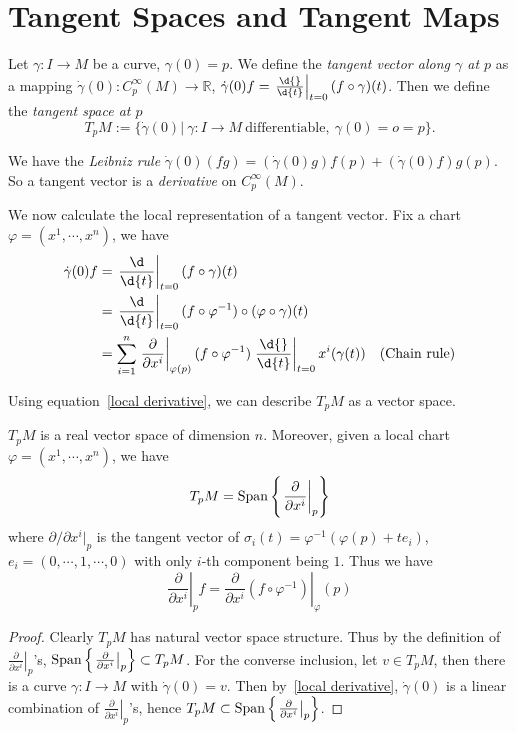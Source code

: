 \section{Tangent Spaces and Tangent Maps}

\begin{defn}
    Let $\gamma:I\to M$ be a curve, $\gamma(0)=p$.
    We define the \emph{tangent vector along $\gamma$ at $p$} as a mapping $\dot{\gamma}(0):C^\infty_p(M)\to\mathbb{R}$, $\dot{\gamma}(0)f=\left.\frac{\d{}}{\d{t}}\right|_{t=0}(f\circ\gamma)(t)$.
    Then we define the \emph{tangent space at $p$}
    \[T_pM:=\{\dot{\gamma}(0)|\ \gamma:I\to M\ \text{differentiable},\ \gamma(0)=o=p\}.\]
\end{defn}

\begin{prop}
    We have the \emph{Leibniz rule} $\dot{\gamma}(0)(fg)=(\dot{\gamma}(0)g)f(p)+(\dot{\gamma}(0)f)g(p)$.
    So a tangent vector is a \emph{derivative} on $C^\infty_p(M)$.
\end{prop}

We now calculate the local representation of a tangent vector.
Fix a chart $\varphi=(x^1,\cdots,x^n)$, we have
\begin{equation}
    \begin{aligned}
        \dot{\gamma}(0)f&=\left.\frac{\d}{\d{t}}\right|_{t=0}(f\circ\gamma)(t)\\
        &=\left.\frac{\d}{\d{t}}\right|_{t=0}(f\circ\varphi^{-1})\circ(\varphi\circ\gamma)(t)\\
        &=\sum_{i=1}^n\left.\frac{\partial{}}{\partial{x^i}}\right|_{\varphi(p)}(f\circ\varphi^{-1})\left.\frac{\d{}}{\d{t}}\right|_{t=0}x^i(\gamma(t))\quad\text{(Chain rule)}
    \end{aligned}\label{local derivative}
\end{equation}

Using equation~\eqref{local derivative}, we can describe $T_pM$ as a vector space.
\begin{prop}
    $T_pM$ is a real vector space of dimension $n$.
    Moreover, given a local chart $\varphi=(x^1,\cdots,x^n)$, we have
    \[T_pM=\operatorname{Span}\left\{\left.\frac{\partial{}}{\partial{x^i}}\right|_p\right\}\]
    where $\partial{}/\partial{x^i}|_p$ is the tangent vector of $\sigma_i(t)=\varphi^{-1}(\varphi(p)+te_i)$, $e_i=(0,\cdots,1,\cdots,0)$ with only $i$-th component being $1$.
    Thus we have
    \[\left.\frac{\partial{}}{\partial{x^i}}\right|_pf=\left.\frac{\partial{}}{\partial{x^i}}(f\circ\varphi^{-1})\right|_\varphi(p)\]
\end{prop}
\begin{proof}
    Clearly $T_pM$ has natural vector space structure.
    Thus by the definition of $\left.\frac{\partial{}}{\partial{x^i}}\right|_p$'s, $\operatorname{Span}\left\{\left.\frac{\partial{}}{\partial{x^i}}\right|_p\right\}\subset T_pM$.
    For the converse inclusion, let $v\in T_pM$, then there is a curve $\gamma:I\to M$ with $\dot{\gamma}(0)=v$.
    Then by~\eqref{local derivative}, $\dot{\gamma}(0)$ is a linear combination of $\left.\frac{\partial{}}{\partial{x^i}}\right|_p$'s, hence $T_pM\subset\operatorname{Span}\left\{\left.\frac{\partial{}}{\partial{x^i}}\right|_p\right\}$.
\end{proof}

